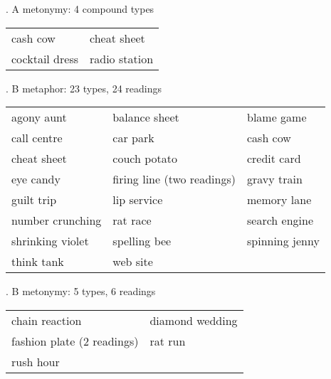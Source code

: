 \ex. A metonymy: 4 compound types\\
\begin{tabular}[h]{ll}
cash cow&cheat sheet\\     
cocktail dress&radio station          
\end{tabular}

\ex. B metaphor: 23 types, 24 readings\\
\begin{tabular}[h]{lll}
agony aunt        &balance sheet   &blame game\\
call centre& car park   &cash cow \\
cheat sheet&couch potato&credit card\\                   
eye candy         &firing line  (two readings) &gravy train\\
guilt trip        &lip service&memory lane \\
number crunching&rat race        &search engine\\
shrinking violet &spelling bee      &spinning jenny   \\
think tank    &web site&
\end{tabular}









\ex. B metonymy: 5 types, 6 readings\\
\begin{tabular}[h]{ll}
chain reaction &   diamond wedding   \\
fashion plate (2 readings)  & rat run \\         
        rush hour &  
\end{tabular}

